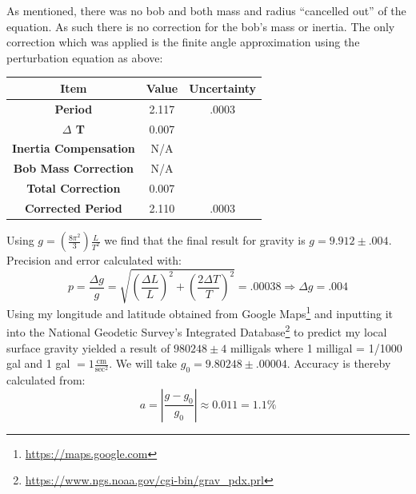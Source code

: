 \documentclass[12pt]{article}
\begin{document}
\begin{enumerate}[label=(\alph*)]
            As mentioned, there was no bob and both mass and radius ``cancelled out'' of the equation. As such there is no correction for the bob's mass or inertia. The only correction which was applied is the finite angle approximation using the perturbation equation as above:
            \begin{center}
                \begin{tabular}{ ||c||c|c|| } 
                    \hline
                    \textbf{Item} & Value & Uncertainty \\ 
                    \hline
                    \textbf{Period} & 2.117 & .0003\\ 
                    \textbf{$\Delta$ T } & 0.007 & \\ 
                    \textbf{Inertia Compensation} & N/A & \\ 
                    \textbf{Bob Mass Correction} & N/A & \\ 
                    \textbf{Total Correction} & 0.007 & \\ 
                    \hline
                    \textbf{Corrected Period} & 2.110 & .0003\\
                    \hline
                \end{tabular}
            \end{center}

            Using $\displaystyle g = \left( \frac{8\pi^2}{3}\right) \frac{L}{T^2}$ we find that the final result for gravity is $g=9.912 \pm .004$.
            Precision and error calculated with: \[ 
                p = \frac{\Delta g}{g} = \sqrt{\left(\frac{\Delta L}{L}\right)^2 + \left( \frac{2 \Delta T}{T}\right)^2} = .00038 \Rightarrow \Delta g = .004
            \]
            Using my longitude and latitude obtained from Google Maps\footnote{\url{https://maps.google.com}} and inputting it into the National Geodetic Survey's Integrated Database\footnote{\url{https://www.ngs.noaa.gov/cgi-bin/grav_pdx.prl}} to predict my local surface gravity yielded a result of $980248 \pm 4$ milligals where 1 milligal = 1/1000 gal and 1 gal  $ =  1 \displaystyle \frac{\text{cm}}{\text{sec}^2}$. We will take $g_0 = 9.80248 \pm .00004$. Accuracy is thereby calculated from: \[
                a = \left| \frac{g - g_0}{g_0} \right| \approx 0.011 = 1.1 \%
            \]
            


\end{enumerate}
\end{document}
